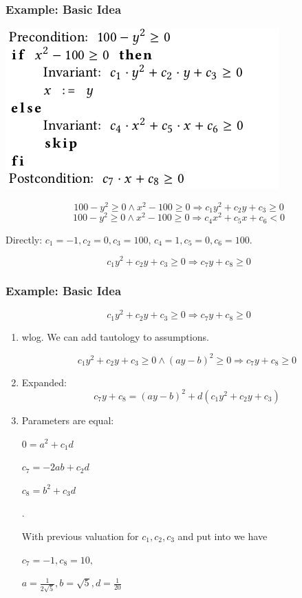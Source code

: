 \documentclass[11pt]{beamer}
\begin{document}
\begin{frame}\frametitle{Example: Basic Idea}
\begin{center}
\includegraphics[scale=0.3]{example1.png}
\end{center}
\begin{footnotesize}

\[100-y^2 \ge 0 \wedge x^2 - 100\ge 0 \Rightarrow c_1y^2 + c_2y+c_3\ge 0\]
\[100-y^2 \ge 0 \wedge x^2 - 100\ge 0 \Rightarrow c_4x^2+ c_5x+c_6< 0\]
\end{footnotesize}
Directly: $c_1 = -1, c_2 = 0, c_3 = 100$, $c_4 = 1, c_5 = 0, c_6 = 100$.

\[c_1y^2 + c_2y+c_3\ge 0\Rightarrow c_7y + c_8 \ge 0\]

\end{frame}
\begin{frame}\frametitle{Example: Basic Idea}
\begin{small}
\[c_1y^2 + c_2y+c_3\ge 0\Rightarrow c_7y + c_8 \ge 0\]
\end{small}

\begin{enumerate}
\item wlog. We can add tautology to assumptions.
\begin{small}
\[c_1y^2 + c_2y+c_3\ge 0 \wedge (ay - b)^2\ge 0\Rightarrow c_7y + c_8 \ge 0\]
\end{small}
\item Expanded: 
\[c_7y + c_8 = (ay - b)^2 + d(c_1y^2 + c_2y + c_3)\]

\item Parameters are equal:
\begin{multicols}{2}
$0 = a^2 + c_1d$

$c_7 = -2ab + c_2d$

$c_8 = b^2 + c_3d$

$ .$

With previous valuation for $c_1,c_2,c_3$ and put into  we have 

$c_7 = -1, c_8 = 10, $

$a = \frac{1}{2\sqrt{5}}, b = \sqrt{5}, d = \frac{1}{20}$

\end{multicols}

\end{enumerate}

\end{frame}
\end{document}

